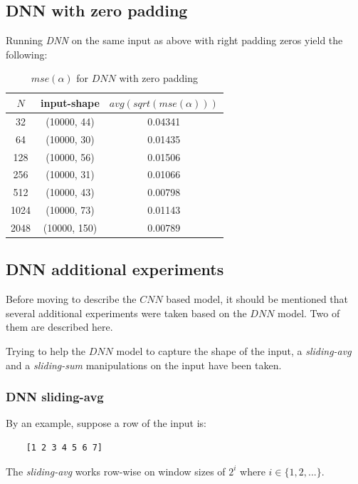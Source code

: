 \documentclass[a4paper, 12pt]{report}
\begin{document}
\subsection{DNN with zero padding}
\par Running \textit{DNN} on the same input as above with right padding zeros yield the following:
\begin{table}[h!]
    \centering
    \begin{tabular}{||c c c||} 
        \hline
        $N$ & input-shape & $avg(sqrt(mse(\alpha)))$ \\ [0.5ex] 
        \hline\hline
        32 & (10000, 44) & 0.04341 \\ 
        \hline
        64 & (10000, 30) & 0.01435 \\
        \hline
        128 & (10000, 56) & 0.01506 \\
        \hline
        256 & (10000, 31) & 0.01066 \\
        \hline
        512 & (10000, 43) & 0.00798 \\ 
        \hline
        1024 & (10000, 73) & 0.01143 \\ 
        \hline
        2048 & (10000, 150) & 0.00789 \\ 
        \hline
    \end{tabular}
    \caption{$mse(\alpha)$ for $DNN$ with zero padding}
    \label{table:dnn-zero-sqrt-mse}
\end{table}

\pagebreak
\subsection{DNN additional experiments}
Before moving to describe the $CNN$ based model, it should be mentioned that several additional experiments were taken based on the $DNN$ model. Two of them are described here.

Trying to help the $DNN$ model to capture the shape of the input, a \textit{sliding-avg} and a \textit{sliding-sum} manipulations on the input have been taken.

\subsubsection{DNN sliding-avg}
By an example, suppose a row of the input is:
\begin{verbatim}
    [1 2 3 4 5 6 7]
\end{verbatim}

The \textit{sliding-avg} works row-wise on window sizes of $2^i$ where $i \in \{1,2,...\}$.
\end{document}
